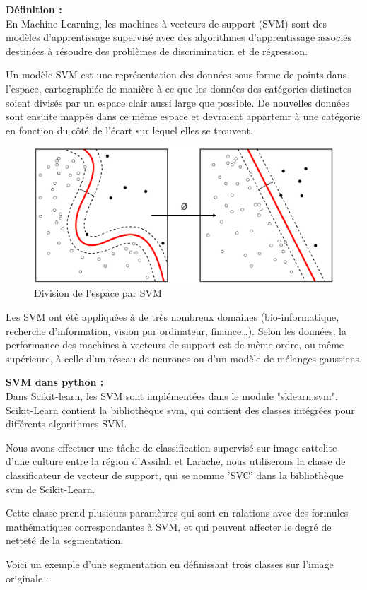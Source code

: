 \documentclass[12pt, openany]{report}
\begin{document}
\textbf{Définition :}\\
En Machine Learning, les machines à vecteurs de support (SVM) sont des modèles d'apprentissage supervisé avec des algorithmes d'apprentissage associés destinées à résoudre des problèmes de discrimination et de régression. 
\par
Un modèle SVM est une représentation des données sous forme de points dans l'espace, cartographiée de manière à ce que les données des catégories distinctes soient divisés par un espace clair aussi large que possible. De nouvelles données sont ensuite mappés dans ce même espace et devraient appartenir à une catégorie en fonction du côté de l'écart sur lequel elles se trouvent.
\begin{figure}[H]
\centering
\includegraphics[scale=0.2]{svm.png}
\caption{Division de l'espace par SVM}
\end{figure}

\par
Les SVM ont été appliquées à de très nombreux domaines (bio-informatique, recherche d'information, vision par ordinateur, finance…). Selon les données, la performance des machines à vecteurs de support est de même ordre, ou même supérieure, à celle d'un réseau de neurones ou d'un modèle de mélanges gaussiens.

\textbf{SVM dans python :} \\
Dans Scikit-learn, les SVM sont implémentées dans le module "sklearn.svm".
Scikit-Learn contient la bibliothèque svm, qui contient des classes intégrées pour différents algorithmes SVM. 
\par
Nous avons effectuer une tâche de classification supervisé sur image sattelite d'une culture entre la région d'Assilah et Larache, nous utiliserons la classe de classificateur de vecteur de support, qui se nomme 'SVC' dans la bibliothèque svm de Scikit-Learn.
\par
Cette classe prend plusieurs paramètres qui sont en ralations avec des formules mathématiques correspondantes à SVM, et qui peuvent affecter le degré de netteté de la segmentation.
\par
Voici un exemple d'une segmentation en définissant trois classes sur l'image originale : 
\end{document}
